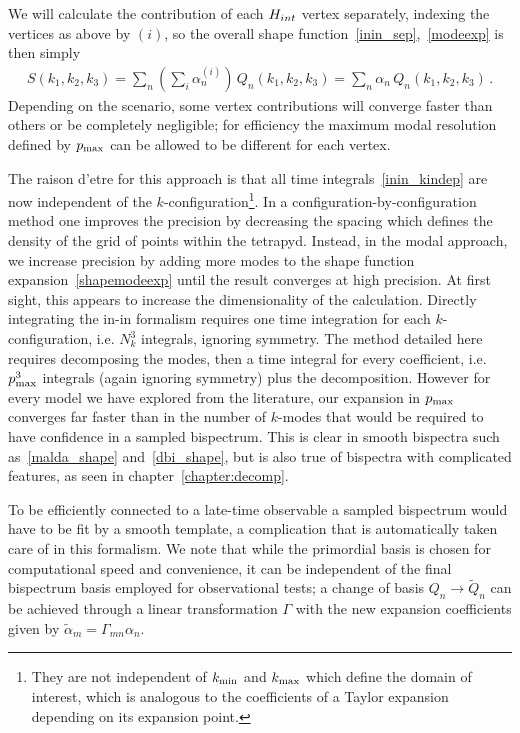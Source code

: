 We will calculate the contribution of each $H_{int}$ vertex separately,
indexing the vertices as above by $(i)$, so the overall shape function~\eqref{inin_sep},~\eqref{modeexp} is then simply
\begin{eqnarray}\label{shapemodeexp}
    S(k_1, k_2,k_3) =   \sum_n \left(\sum_i \alpha_n^{(i)}\right) \, Q_n(k_1,k_2,k_3) =  \sum_n \alpha_n \, Q_n(k_1,k_2,k_3) \,.
\end{eqnarray}
Depending on the scenario,  some vertex contributions will converge faster than others 
or be completely negligible;
for efficiency the maximum modal resolution defined by $p_\text{max}$ can be allowed to be different
for each vertex.  
 

The raison d'etre for this approach is that all time integrals~\eqref{inin_kindep} are now independent of the $k$-configuration\footnote{
    They are not independent of ${k_\text{min}}$ and ${k_\text{max}}$ which define the domain of interest,
    which is analogous to the coefficients of a Taylor expansion depending on its expansion point.
}.
In a configuration-by-configuration method one improves the precision by
decreasing the spacing which defines the density of the grid of points within the tetrapyd.
Instead, in the modal approach, we increase precision by adding more modes to the shape function expansion~\eqref{shapemodeexp}
until the result converges at high precision.   At first sight, this appears to increase the dimensionality of the calculation.
Directly integrating the in-in formalism requires one time
integration for each $k$-configuration, i.e. $N_k^3$ integrals, ignoring symmetry.
The method detailed here requires decomposing the modes,
then a time integral for every coefficient, i.e. $p_\text{max}^3$ integrals
(again ignoring symmetry) plus the decomposition.
However for every model we have explored from the literature,
our expansion in $p_\text{max}$ converges far faster than in the number of
$k$-modes that would be required to have confidence in a sampled bispectrum.
This is clear in smooth bispectra such as~\eqref{malda_shape} and~\eqref{dbi_shape},
but is also true of bispectra with complicated features,
as seen in chapter~\ref{chapter:decomp}.

To be efficiently connected to a late-time observable
a sampled bispectrum would have to be fit by a smooth template,
a complication that is automatically taken care of in this formalism.
We note that while the primordial basis is chosen for computational speed and convenience, it can be 
independent of the final bispectrum basis employed for observational tests; a change of basis $Q_n\rightarrow \tilde Q_n$ can be achieved through a linear transformation $\Gamma$ with the new expansion coefficients given by $\tilde \alpha_m = \Gamma_{mn}\alpha_n$. 


